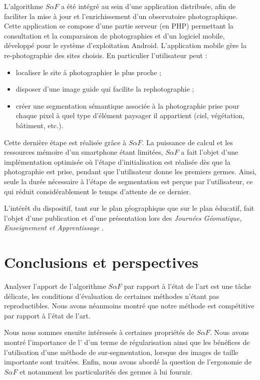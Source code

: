 L'algorithme $S \alpha F$ a été intégré au sein d'une application distribuée, afin de faciliter la mise à jour et l'enrichissement d'un observatoire photographique. Cette application se compose d'une partie serveur (en PHP)\modif{,} permettant la consultation et la comparaison de photographies\modif{,} et d'un logiciel mobile, développé pour le système d'exploitation Android. L'application mobile gère la re-photographie des sites choisis. En particulier l'utilisateur peut :
\begin{itemize}
\item localiser le site à photographier le plus proche ;
\item disposer d'une image guide qui facilite la rephotographie ;
\item créer une segmentation sémantique associée à la photographie prise  pour chaque pixel\modif{,} à quel type d'élément paysager il appartient (ciel, végétation, bâtiment, etc.).
\end{itemize}
Cette dernière étape est réalisée grâce à $S \alpha F$. La puissance de calcul et les ressources mémoire d'un smartphone étant limitées, $S \alpha F$ a fait l'objet d'une implémentation optimisée où l'étape d'initialisation est réalisée dès que la photographie est prise, pendant que l'utilisateur donne les premiers germes. Ainsi, seule la durée nécessaire à l'étape de segmentation est perçue par l'utilisateur, ce qui réduit considérablement le temps d'attente de ce dernier.

L'intérêt du dispositif, tant sur le plan géographique que sur le plan éducatif,  fait l'objet d'une publication \cite{puel2017une} et d'une présentation lors des \emph{Journées Géomatique, Enseignement et Apprentissage} .

\section{Conclusions et perspectives} 

Analyser l'apport de l'algorithme $S \alpha F$ par rapport à l'état de l'art est une tâche délicate, les conditions d'évaluation de certaines méthodes n'étant pas reproductibles. Nous avons néanmoins montré que notre méthode est compétitive par rapport à l'état de l'art. 

Nous nous sommes ensuite intéressés à certaines propriétés de $S \alpha F$. Nous avons montré l'importance de l' d'un terme de régularisation ainsi que les bénéfices de l'utilisation d'une méthode de sur-segmentation, lorsque des images de taille importante sont traitées. Enfin, nous avons abordé la question de l'ergonomie de $S \alpha F$ et notamment les particularités des germes à lui fournir.

